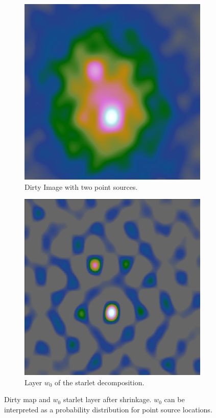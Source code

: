\begin{figure}[h]
	\centering
	\begin{subfigure}[b]{0.25\linewidth}
		\includegraphics[width=\linewidth]{./chapters/05.algorithms/starlets/dirty2.png}
		\caption{Dirty Image with two point sources.}
		\label{cd:heuristic:dirty}
	\end{subfigure}
	\begin{subfigure}[b]{0.25\linewidth}
		\includegraphics[width=\linewidth]{./chapters/05.algorithms/starlets/starlet0_2.png}
		\caption{Layer $w_0$ of the starlet decomposition.}
		\label{cd:heuristic:starlet}
	\end{subfigure}
	\caption{Dirty map and $w_0$ starlet layer after shrinkage. $w_0$ can be interpreted as a probability distribution for point source locations.}
	\label{cd:heuristic:figure}
\end{figure}

